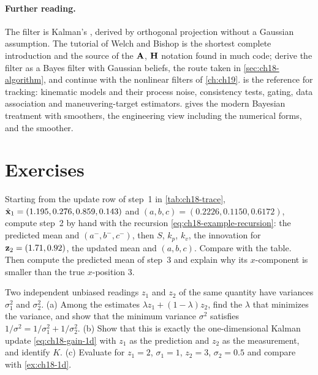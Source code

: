 \paragraph{Further reading.}
The filter is Kalman's \cite{kalman1960new}, derived by orthogonal projection
without a Gaussian assumption. The tutorial of Welch and Bishop
\cite{welch1995introduction} is the shortest complete introduction and the
source of the $\mathbf{A}$, $\mathbf{H}$ notation found in much code;
\textcite[ch.~3]{thrun2005probabilistic} derive the filter as a Bayes filter
with Gaussian beliefs, the route taken in \cref{sec:ch18-algorithm}, and
continue with the nonlinear filters of \cref{ch:ch19}.
\textcite{barshalom2001estimation} is the reference for tracking: kinematic
models and their process noise, consistency tests, gating, data association
and maneuvering-target estimators. \textcite{sarkka2013bayesian} gives the
modern Bayesian treatment with smoothers, \textcite{maybeck1979stochastic}
the engineering view including the numerical forms, and
\textcite{rauch1965maximum} the smoother.

\section{Exercises}
\label{sec:ch18-exercises}

\begin{exercise}[\difficulty{1}]
\label{exr:ch18-hand}
Starting from the update row of step~1 in \cref{tab:ch18-trace},
$\hat{\mathbf{x}}_1=(1.195,0.276,0.859,0.143)$ and $(a,b,c)=(0.2226,0.1150,0.6172)$,
compute step~2 by hand with the recursion \cref{eq:ch18-example-recursion}:
the predicted mean and $(a^-,b^-,c^-)$, then $S$, $k_p$, $k_v$, the
innovation for $\mathbf{z}_2=(1.71,0.92)$, the updated mean and $(a,b,c)$. Compare
with the table. Then compute the predicted mean of step~3 and explain why its
$x$-component is smaller than the true $x$-position $3$.
\end{exercise}

\begin{exercise}[\difficulty{1}]
\label{exr:ch18-scales}
Two independent unbiased readings $z_1$ and $z_2$ of the same quantity have
variances $\sigma_1^2$ and $\sigma_2^2$. (a) Among the estimates
$\lambda z_1+(1-\lambda)z_2$, find the $\lambda$ that minimizes the variance,
and show that the minimum variance $\sigma^2$ satisfies
$1/\sigma^2=1/\sigma_1^2+1/\sigma_2^2$. (b) Show that this is exactly the
one-dimensional Kalman update \cref{eq:ch18-gain-1d} with $z_1$ as the
prediction and $z_2$ as the measurement, and identify $K$. (c) Evaluate for
$z_1=2$, $\sigma_1=1$, $z_2=3$, $\sigma_2=0.5$ and compare with
\cref{ex:ch18-1d}.
\end{exercise}

